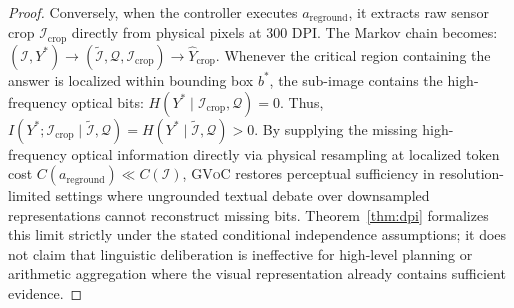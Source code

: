 \documentclass[11pt]{article}
\begin{document}
\begin{proof}
Conversely, when the controller executes $a_{\text{reground}}$, it extracts raw sensor crop $\mathcal{I}_{\text{crop}}$ directly from physical pixels at 300 DPI. The Markov chain becomes: $(\mathcal{I}, Y^*) \longrightarrow (\tilde{\mathcal{I}}, \mathcal{Q}, \mathcal{I}_{\text{crop}}) \longrightarrow \hat{Y}_{\text{crop}}$. Whenever the critical region containing the answer is localized within bounding box $b^*$, the sub-image contains the high-frequency optical bits: $H(Y^* \mid \mathcal{I}_{\text{crop}}, \mathcal{Q}) = 0$. Thus, $I(Y^*; \mathcal{I}_{\text{crop}} \mid \tilde{\mathcal{I}}, \mathcal{Q}) = H(Y^* \mid \tilde{\mathcal{I}}, \mathcal{Q}) > 0$. By supplying the missing high-frequency optical information directly via physical resampling at localized token cost $C(a_{\text{reground}}) \ll C(\mathcal{I})$, \textsc{GVoC} restores perceptual sufficiency in resolution-limited settings where ungrounded textual debate over downsampled representations cannot reconstruct missing bits. Theorem~\ref{thm:dpi} formalizes this limit strictly under the stated conditional independence assumptions; it does not claim that linguistic deliberation is ineffective for high-level planning or arithmetic aggregation where the visual representation already contains sufficient evidence.
\end{proof}
\end{document}
